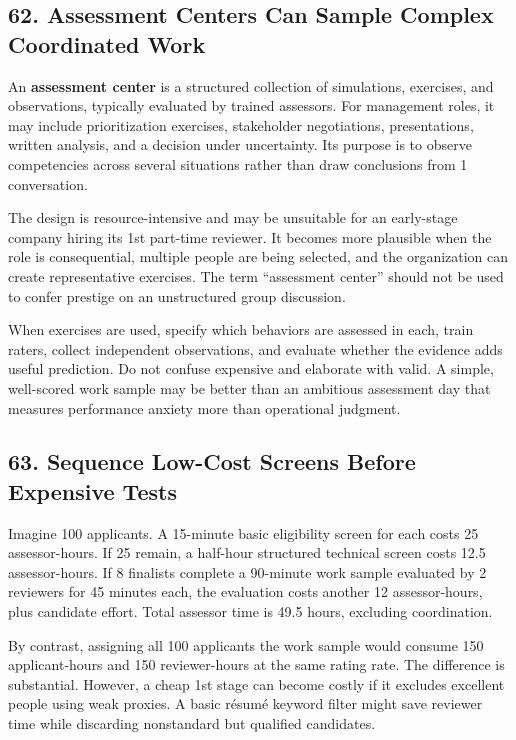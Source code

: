 \subsection*{62. Assessment Centers Can Sample Complex Coordinated Work}

An \textbf{assessment center} is a structured collection of simulations, exercises, and observations, typically evaluated by trained assessors. For management roles, it may include prioritization exercises, stakeholder negotiations, presentations, written analysis, and a decision under uncertainty. Its purpose is to observe competencies across several situations rather than draw conclusions from 1 conversation.

The design is resource-intensive and may be unsuitable for an early-stage company hiring its 1st part-time reviewer. It becomes more plausible when the role is consequential, multiple people are being selected, and the organization can create representative exercises. The term ``assessment center'' should not be used to confer prestige on an unstructured group discussion.

When exercises are used, specify which behaviors are assessed in each, train raters, collect independent observations, and evaluate whether the evidence adds useful prediction. Do not confuse expensive and elaborate with valid. A simple, well-scored work sample may be better than an ambitious assessment day that measures performance anxiety more than operational judgment.

\subsection*{63. Sequence Low-Cost Screens Before Expensive Tests}

Imagine 100 applicants. A 15-minute basic eligibility screen for each costs 25 assessor-hours. If 25 remain, a half-hour structured technical screen costs 12.5 assessor-hours. If 8 finalists complete a 90-minute work sample evaluated by 2 reviewers for 45 minutes each, the evaluation costs another 12 assessor-hours, plus candidate effort. Total assessor time is 49.5 hours, excluding coordination.

By contrast, assigning all 100 applicants the work sample would consume 150 applicant-hours and 150 reviewer-hours at the same rating rate. The difference is substantial. However, a cheap 1st stage can become costly if it excludes excellent people using weak proxies. A basic résumé keyword filter might save reviewer time while discarding nonstandard but qualified candidates.


